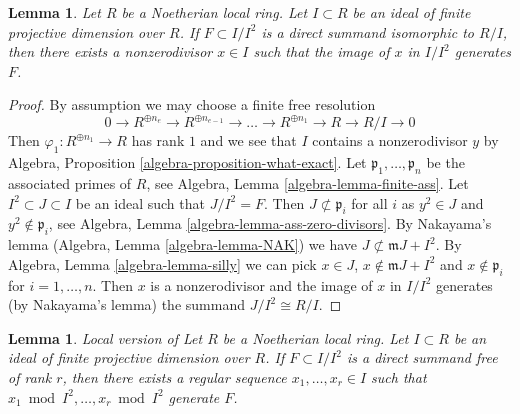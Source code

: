 \documentclass{stacks-project}
\newenvironment{reference}{\comment}{\endcomment}
\theoremstyle{plain}
\newtheorem{lemma}[subsection]{Lemma}
\theoremstyle{definition}
\theoremstyle{remark}
\numberwithin{equation}{subsection}
\begin{document}
\begin{lemma}
\label{lemma-free-summand-in-ideal-finite-proj-dim}
\begin{reference}
\cite{Vasconcelos}
\end{reference}
Let $R$ be a Noetherian local ring. Let $I \subset R$ be an ideal
of finite projective dimension over $R$. If $F \subset I/I^2$ is a
direct summand isomorphic to $R/I$, then there exists a nonzerodivisor
$x \in I$ such that the image of $x$ in $I/I^2$ generates $F$.
\end{lemma}

\begin{proof}
By assumption we may choose a finite free resolution
$$
0 \to R^{\oplus n_e} \to R^{\oplus n_{e-1}} \to \ldots \to
R^{\oplus n_1} \to R \to R/I \to 0
$$
Then $\varphi_1 : R^{\oplus n_1} \to R$ has rank $1$ and
we see that $I$ contains a nonzerodivisor $y$ by
Algebra, Proposition \ref{algebra-proposition-what-exact}.
Let $\mathfrak p_1, \ldots, \mathfrak p_n$ be the associated
primes of $R$, see Algebra, Lemma \ref{algebra-lemma-finite-ass}.
Let $I^2 \subset J \subset I$ be an ideal such that $J/I^2 = F$.
Then $J \not \subset \mathfrak p_i$ for all $i$
as $y^2 \in J$ and $y^2 \not \in \mathfrak p_i$, see
Algebra, Lemma \ref{algebra-lemma-ass-zero-divisors}.
By Nakayama's lemma (Algebra, Lemma \ref{algebra-lemma-NAK})
we have $J \not \subset \mathfrak m J + I^2$.
By Algebra, Lemma \ref{algebra-lemma-silly}
we can pick $x \in J$, $x \not \in \mathfrak m J + I^2$ and
$x \not \in \mathfrak p_i$ for $i = 1, \ldots, n$.
Then $x$ is a nonzerodivisor and the image
of $x$ in $I/I^2$ generates (by Nakayama's lemma)
the summand $J/I^2 \cong R/I$.
\end{proof}

\begin{lemma}
\label{lemma-vasconcelos}
\begin{reference}
Local version of \cite[Theorem 1.1]{Vasconcelos}
\end{reference}
Let $R$ be a Noetherian local ring. Let $I \subset R$ be an ideal
of finite projective dimension over $R$. If $F \subset I/I^2$
is a direct summand free of rank $r$, then there exists a regular sequence
$x_1, \ldots, x_r \in I$ such that $x_1 \bmod I^2, \ldots, x_r \bmod I^2$
generate $F$.
\end{lemma}
\end{document}
